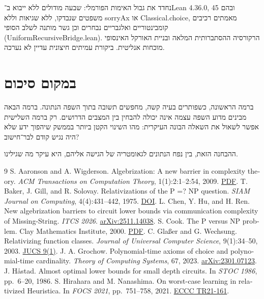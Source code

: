 \documentclass[11pt,a4paper]{article}
\newcommand{\EN}[1]{\textenglish{#1}}
\begin{document}
נחדד את גבול האימות הפורמלי: שבעה מודולים ללא ייבוא ב־\EN{Lean 4.36.0}, ובהם 45 משפטים שנבדקו, ללא שגיאות וללא \EN{sorryAx} או \EN{Classical.choice}, מאמתים רכיבים קומבינטוריים ואלגבריים נבחרים וכן גשר מותנה לשלב הסופי (\EN{UniformRecursiveBridge.lean}). הרקורסיה ההסתברותית המלאה ובניית האורקל האינסופי מוכחות אנליטית. ביקורת עמיתים חיצונית עדיין לא נערכה.

\section{במקום סיכום}
ברמה הראשונה, כשפותרים בעיה קשה, מחפשים תשובה בתוך השפה הנתונה. ברמה הבאה מבינים מדוע השפה עצמה אינה יכולה להבחין בין המצבים הדרושים. רק ברמה השלישית אפשר לשאול את השאלה הבונה העיקרית: מהו השינוי הקטן ביותר בממשק שיהפוך ידע שלא היה נגיש קודם לבר־חישוב?

ההבחנה הזאת, בין נפח הנתונים לגאומטריה של הגישה אליהם, היא עיקר מה שגילינו.

\begin{LTR}
\begin{english}
\renewcommand{\refname}{\texthebrew{מקורות}}
\begin{thebibliography}{9}
 S. Aaronson and A. Wigderson. Algebrization: A new barrier in complexity theory. \textit{ACM Transactions on Computation Theory}, 1(1):2:1--2:54, 2009. \href{https://www.scottaaronson.com/papers/alg.pdf}{PDF}.
 T. Baker, J. Gill, and R. Solovay. Relativizations of the P =? NP question. \textit{SIAM Journal on Computing}, 4(4):431--442, 1975. \href{https://epubs.siam.org/doi/10.1137/0204037}{DOI}.
 L. Chen, Y. Hu, and H. Ren. New algebrization barriers to circuit lower bounds via communication complexity of Missing-String. \textit{ITCS 2026}. \href{https://arxiv.org/abs/2511.14038}{arXiv:2511.14038}.
 S. Cook. The P versus NP problem. Clay Mathematics Institute, 2000. \href{https://www.claymath.org/wp-content/uploads/2022/06/pvsnp.pdf}{PDF}.
 C. Glaßer and G. Wechsung. Relativizing function classes. \textit{Journal of Universal Computer Science}, 9(1):34--50, 2003. \href{https://lib.jucs.org/issue/4069/}{JUCS 9(1)}.
 J. A. Grochow. Polynomial-time axioms of choice and polynomial-time cardinality. \textit{Theory of Computing Systems}, 67, 2023. \href{https://arxiv.org/abs/2301.07123}{arXiv:2301.07123}.
 J. H\aa stad. Almost optimal lower bounds for small depth circuits. In \textit{STOC 1986}, pp.~6--20, 1986.
 S. Hirahara and M. Nanashima. On worst-case learning in relativized Heuristica. In \textit{FOCS 2021}, pp.~751--758, 2021. \href{https://eccc.weizmann.ac.il/report/2021/161/download}{ECCC TR21-161}.
\end{thebibliography}
\end{english}
\end{LTR}
\end{document}
